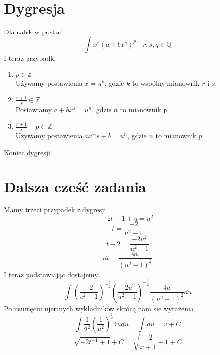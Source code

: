 \documentclass[11pt]{article}
\begin{document}
\section{Dygresja}
Dla całek w postaci
$$ \int x^r(a+bx^s)^p \quad r,s,q \in \mathbb{Q} $$
I teraz przypadki
\begin{enumerate}
\item{ $p \in \mathbb{Z}$} \\
Używamy postawienia $x = u^{k}$, gdzie $ k $ to wspólny mianownik $r$ i $s$.
\item{ $\frac{r+1}{s} \in \mathbb{Z} $} \\
Postawiamy $ a + bx^s = u^n $, gdzie $n$ to mianownik p
\item{ $\frac{r+1}{s} + p \in \mathbb{Z}$ } \\
Używamy postawienia $ax^-s + b = u^n$, gdzie $n$ to mianownik $p$.
\end{enumerate}
Koniec dygresji...

\section{Dalsza cześć zadania}
Mamy trzeci przypadek z dygresji
$$ -2t-1 + u = u^2 $$
$$ t = \frac{-2}{u^2-1} $$
$$ t-2 = \frac{-2u^2}{u^2-1}$$
$$ dt = \frac{4u}{(u^2-1)^2} $$
I teraz podstawiając dostajemy 
$$ \int \left( \frac{-2}{u^2-1} \right)^{-\frac{3}{2}} \left( \frac{-2u^2}{u^2-1} \right)^{-\frac{1}{2}} \frac{4u}{(u^2-1)^2}du $$
Po usunięciu ujemnych wykładników skrócą nam sie wyrażenia
$$ \int \frac{1}{2^2}\left(\frac{1}{u^2} \right)^{\frac{1}{2}} 4u du = \int du = u + C $$
$$\sqrt{-2t^{-1} + 1} + C = \sqrt{\frac{-2}{x+1} + 1} + C $$
\end{document}
